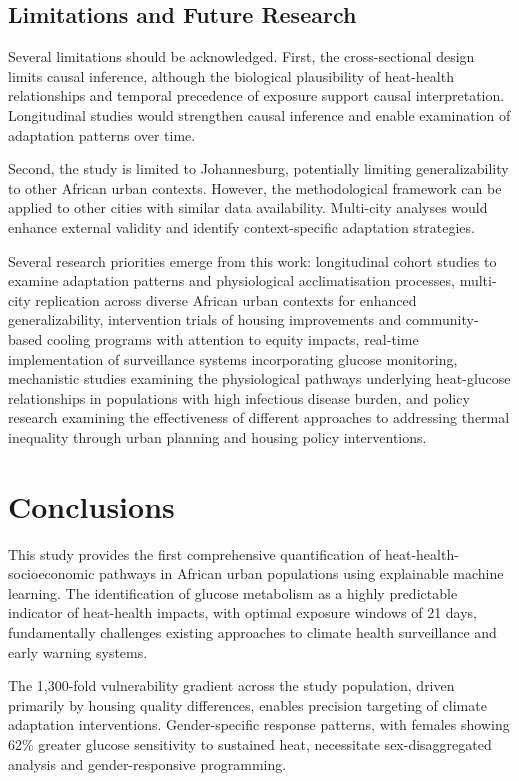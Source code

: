 \documentclass[11pt,a4paper]{article}
\begin{document}
\subsection{Limitations and Future Research}

Several limitations should be acknowledged. First, the cross-sectional design limits causal inference, although the biological plausibility of heat-health relationships and temporal precedence of exposure support causal interpretation. Longitudinal studies would strengthen causal inference and enable examination of adaptation patterns over time.

Second, the study is limited to Johannesburg, potentially limiting generalizability to other African urban contexts. However, the methodological framework can be applied to other cities with similar data availability. Multi-city analyses would enhance external validity and identify context-specific adaptation strategies.

Several research priorities emerge from this work: longitudinal cohort studies to examine adaptation patterns and physiological acclimatisation processes, multi-city replication across diverse African urban contexts for enhanced generalizability, intervention trials of housing improvements and community-based cooling programs with attention to equity impacts, real-time implementation of surveillance systems incorporating glucose monitoring, mechanistic studies examining the physiological pathways underlying heat-glucose relationships in populations with high infectious disease burden, and policy research examining the effectiveness of different approaches to addressing thermal inequality through urban planning and housing policy interventions.

\section{Conclusions}

This study provides the first comprehensive quantification of heat-health-socioeconomic pathways in African urban populations using explainable machine learning. The identification of glucose metabolism as a highly predictable indicator of heat-health impacts, with optimal exposure windows of 21 days, fundamentally challenges existing approaches to climate health surveillance and early warning systems.

The 1,300-fold vulnerability gradient across the study population, driven primarily by housing quality differences, enables precision targeting of climate adaptation interventions. Gender-specific response patterns, with females showing 62\% greater glucose sensitivity to sustained heat, necessitate sex-disaggregated analysis and gender-responsive programming.
\end{document}
